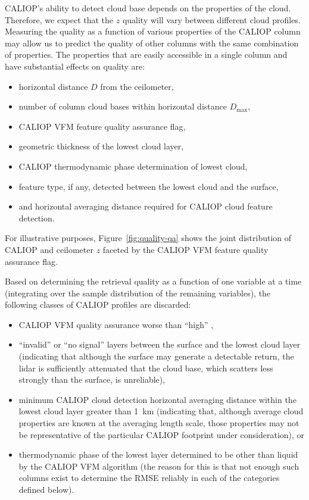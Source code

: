 \documentclass[essd,manuscript]{copernicus}\usepackage[]{graphicx}\usepackage[]{color}
\newcommand\CBH{\ensuremath{z}}
\begin{document}
CALIOP's ability to detect cloud base depends on the properties of the cloud.
Therefore, we expect that the \CBH{} quality will vary between
different cloud profiles.  Measuring the quality as a function of various
properties of the CALIOP column may allow us to predict the quality of other
columns with the same combination of properties.  The properties that are easily
accessible in a single column and have substantial effects on quality are:
\begin{itemize}
\item horizontal distance $D$ from the ceilometer,
\item number of column cloud bases within horizontal distance $D_\text{max}$,
\item CALIOP VFM feature quality assurance flag,
\item geometric thickness of the lowest cloud layer,
\item CALIOP thermodynamic phase determination of lowest cloud,
\item feature type, if any, detected between the lowest cloud and the surface,
\item and horizontal averaging distance required for CALIOP cloud feature
  detection.
\end{itemize}
For illustrative purposes, Figure~\ref{fig:quality-qa} shows the joint
distribution of CALIOP and ceilometer \CBH{} faceted by the CALIOP
VFM feature quality assurance flag.  

Based on determining the retrieval quality as a function of one variable at a
time (integrating over the sample distribution of the remaining variables), the
following classes of CALIOP profiles are discarded:
\begin{itemize}
\item CALIOP VFM quality assurance worse than ``high'' ,
\item ``invalid'' or ``no signal'' layers between the surface and the lowest
  cloud layer (indicating that although the surface may generate a detectable
  return, the lidar is sufficiently attenuated that the cloud base, which
  scatters less strongly than the surface, is unreliable),
\item minimum CALIOP cloud detection horizontal averaging distance within the
  lowest cloud layer greater than 1~km (indicating that, although average cloud
  properties are known at the averaging length scale, those properties may not
  be representative of the particular CALIOP footprint under consideration), or
\item thermodynamic phase of the lowest layer determined to be other than liquid
  by the CALIOP VFM algorithm (the reason for this is that not enough such
  columns exist to determine the RMSE reliably in each of the categories defined
  below).
\end{itemize}
\end{document}
